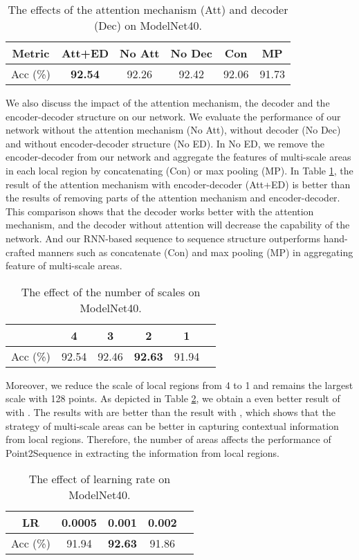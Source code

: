 \documentclass[letterpaper]{article}
\begin{document}
\begin{table}[htp]
\centering
\caption{The effects of the attention mechanism (Att) and decoder (Dec) on ModelNet40.}
\label{table:att}
\begin{tabular}{cccccc}\hline
Metric&Att+ED&No Att&No Dec &Con &MP \\ \hline
Acc (\%)&\textbf{92.54}&92.26&92.42&92.06 &91.73\\ \hline
\end{tabular}
\end{table}
We also discuss the impact of the attention mechanism, the decoder and the encoder-decoder structure on our network.
We evaluate the performance of our network without the attention mechanism (No Att), without decoder (No Dec) and without encoder-decoder structure (No ED).
In No ED, we remove the encoder-decoder from our network and aggregate the features of multi-scale areas in each local region by concatenating (Con) or max pooling (MP).
In Table \ref{table:att}, the result of the attention mechanism with encoder-decoder (Att+ED) is better than the results of removing parts of the attention mechanism and encoder-decoder.
This comparison shows that the decoder works better with the attention mechanism, and the decoder without attention will decrease the capability of the network.
And our RNN-based sequence to sequence structure outperforms hand-crafted manners such as concatenate (Con) and max pooling (MP) in aggregating feature of multi-scale areas.
\begin{table}[htp]
\centering
\caption{The effect of the number of scales  on ModelNet40.}
\label{table:scales}
\begin{tabular}{cccccc}\hline
&4&3&2&1\\ \hline
Acc (\%)&92.54&92.46&\textbf{92.63}&91.94\\ \hline
\end{tabular}
\end{table}

Moreover, we reduce the scale of local regions  from 4 to 1 and remains the largest scale with 128 points.
As depicted in Table \ref{table:scales}, we obtain a even better result of  with  . 
The results with  are better than the result with , which shows that the strategy of multi-scale areas can be better in capturing contextual information from local regions.
Therefore, the number of areas  affects the performance of Point2Sequence in extracting the information from local regions.

\begin{table}[!htp]
\centering
\caption{The effect of learning rate on ModelNet40.}
\label{table:lr}
\begin{tabular}{ccccc}\hline
LR&0.0005&0.001&0.002\\ \hline
Acc (\%)&91.94&\textbf{92.63}&91.86\\ \hline
\end{tabular}
\end{table}
\end{document}
